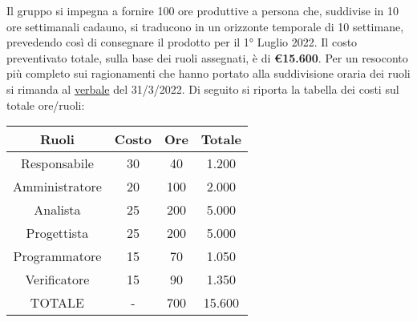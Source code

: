 Il gruppo \textit{\teamname} si impegna a fornire 100 ore produttive a persona che, suddivise in 10 ore settimanali cadauno, si traducono in un orizzonte temporale di 10 settimane, prevedendo così di consegnare il prodotto per il 1° Luglio 2022. \newline
Il costo preventivato totale, sulla base dei ruoli assegnati, è di \textbf{\euro{15.600}}. \newline
Per un resoconto più completo sui ragionamenti che hanno portato alla suddivisione oraria dei ruoli si rimanda al \href{https://github.com/Bug-s-Bunny-Team/docs/blob/master/docs/Verbali/Interni/vi_20220331.pdf}{verbale} del 31/3/2022. \newline
Di seguito si riporta la tabella dei costi sul totale ore/ruoli:
\begin{table}
	\begin{center}
		\setlength{\extrarowheight}{.75ex}
		\begin{tabular}{ | c | c | c | c | }
			\hline 	
			\textbf{Ruoli} & \textbf{Costo} & \textbf{Ore} & \textbf{Totale}\\
			\hline 			
			
			Responsabile{} & 30{} & 40{} & 1.200{} \\
			Amministratore{} & 20{} & 100{} & 2.000{} \\
			Analista{} & 25{} & 200{} & 5.000{} \\
			Progettista{} & 25{} & 200{} & 5.000{}  \\
			Programmatore{} & 15{} & 70{} & 1.050{}  \\
			Verificatore{} & 15{} & 90{} & 1.350{}  \\
			TOTALE{} & -{} & 700{} & 15.600{}  \\	
			
			\hline 
		\end{tabular}
	\end{center}
\end{table}